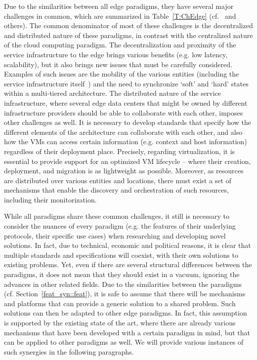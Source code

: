 \documentclass[twocolumn,preprint,3p]{elsarticle}
\begin{document}
Due to the similarities between all edge paradigms, they have several major challenges in common, which are summarized in Table~\ref{T:ChEdge} (cf.~\cite{Yi15, WangMCC15, MEDwhite15} and others). The common denominator of most of these challenges is the decentralized and distributed nature of these paradigms, in contrast with the centralized nature of the cloud computing paradigm. The decentralization and proximity of the service infrastructure to the edge brings various benefits (e.g. low latency, scalability), but it also brings new issues that must be carefully considered. Examples of such issues are the mobility of the various entities (including the service infrastructure itself~\cite{Loke15}) and the need to synchronize `soft' and `hard' states within a multi-tiered architecture. The distributed nature of the service infrastructure, where several edge data centers that might be owned by different infrastructure providers should be able to collaborate with each other, imposes other challenges as well. It is necessary to develop standards that specify how the different elements of the architecture can collaborate with each other, and also how the VMs can access certain information (e.g. context and host information) regardless of their deployment place. Precisely, regarding virtualization, it is essential to provide support for an optimized VM lifecycle -- where their creation, deployment, and migration is as lightweight as possible. Moreover, as resources are distributed over various entities and locations, there must exist a set of mechanisms that enable the discovery and orchestration of such resources, including their monitorization.

While all paradigms share these common challenges, it still is necessary to consider the nuances of every paradigm (e.g. the features of their underlying protocols, their specific use cases) when researching and developing novel solutions. In fact, due to technical, economic and political reasons, it is clear that multiple standards and specifications will coexist, with their own solutions to existing problems. Yet, even if there are several structural differences between the paradigms, it does not mean that they should exist in a vacuum, ignoring the advances in other related fields. Due to the similarities between the paradigms (cf. Section~\ref{feat_syn::feat}), it is safe to assume that there will be mechanisms and platforms that can provide a generic solution to a shared problem. Such solutions can then be adapted to other edge paradigms. In fact, this assumption is supported by the existing state of the art, where there are already various mechanisms that have been developed with a certain paradigm in mind, but that can be applied to other paradigms as well. We will provide various instances of such synergies in the following paragraphs.
\end{document}
